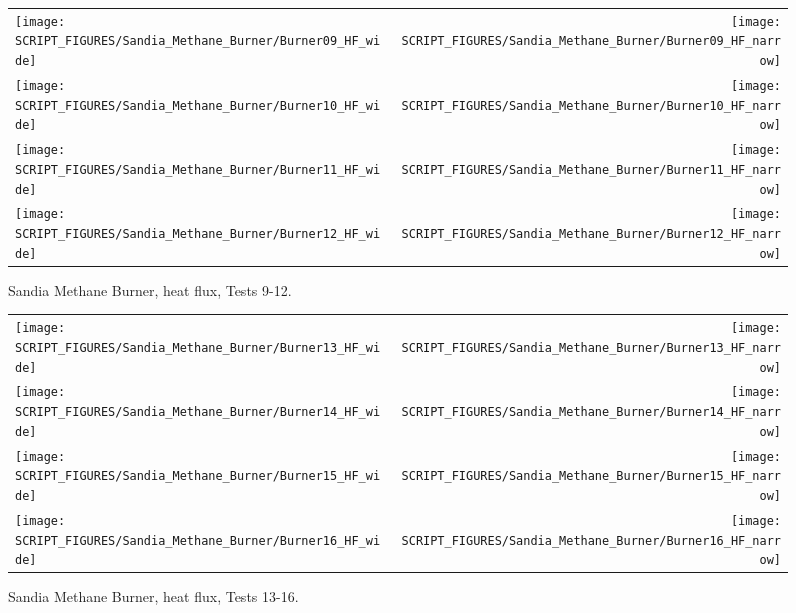 \begin{figure}[p]
\begin{tabular*}{\textwidth}{l@{\extracolsep{\fill}}r}
\texttt{[image: SCRIPT\_FIGURES/Sandia\_Methane\_Burner/Burner09\_HF\_wide]} &
\texttt{[image: SCRIPT\_FIGURES/Sandia\_Methane\_Burner/Burner09\_HF\_narrow]} \\
\texttt{[image: SCRIPT\_FIGURES/Sandia\_Methane\_Burner/Burner10\_HF\_wide]} &
\texttt{[image: SCRIPT\_FIGURES/Sandia\_Methane\_Burner/Burner10\_HF\_narrow]} \\
\texttt{[image: SCRIPT\_FIGURES/Sandia\_Methane\_Burner/Burner11\_HF\_wide]} &
\texttt{[image: SCRIPT\_FIGURES/Sandia\_Methane\_Burner/Burner11\_HF\_narrow]} \\
\texttt{[image: SCRIPT\_FIGURES/Sandia\_Methane\_Burner/Burner12\_HF\_wide]} &
\texttt{[image: SCRIPT\_FIGURES/Sandia\_Methane\_Burner/Burner12\_HF\_narrow]}
\end{tabular*}
\caption[Sandia Methane Burner, heat flux, Tests 9-12] {Sandia Methane Burner, heat flux, Tests 9-12.}
\label{Sandia_Methane_Burner_HF_3}
\end{figure}

\begin{figure}[p]
\begin{tabular*}{\textwidth}{l@{\extracolsep{\fill}}r}
\texttt{[image: SCRIPT\_FIGURES/Sandia\_Methane\_Burner/Burner13\_HF\_wide]} &
\texttt{[image: SCRIPT\_FIGURES/Sandia\_Methane\_Burner/Burner13\_HF\_narrow]} \\
\texttt{[image: SCRIPT\_FIGURES/Sandia\_Methane\_Burner/Burner14\_HF\_wide]} &
\texttt{[image: SCRIPT\_FIGURES/Sandia\_Methane\_Burner/Burner14\_HF\_narrow]} \\
\texttt{[image: SCRIPT\_FIGURES/Sandia\_Methane\_Burner/Burner15\_HF\_wide]} &
\texttt{[image: SCRIPT\_FIGURES/Sandia\_Methane\_Burner/Burner15\_HF\_narrow]} \\
\texttt{[image: SCRIPT\_FIGURES/Sandia\_Methane\_Burner/Burner16\_HF\_wide]} &
\texttt{[image: SCRIPT\_FIGURES/Sandia\_Methane\_Burner/Burner16\_HF\_narrow]}
\end{tabular*}
\caption[Sandia Methane Burner, heat flux, Tests 13-16] {Sandia Methane Burner, heat flux, Tests 13-16.}
\label{Sandia_Methane_Burner_HF_4}
\end{figure}

